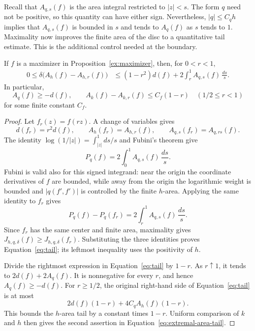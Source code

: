 Recall that $A_{q,s}(f)$ is the area integral restricted to $|z|<s$.
The form $q$ need not be positive, so this quantity can have either
sign. Nevertheless, $|q|\leq C_qh$ implies that $A_{q,s}(f)$ is bounded
in $s$ and tends to $A_q(f)$ as $s$ tends to $1$.
Maximality now improves the finite area of the disc to a quantitative
tail estimate. This is the additional control needed at the boundary.

\begin{lemma}
\label{ex:dilation}
If $f$ is a maximizer in Proposition~\ref{ex:maximizer}, then, for
$0<r<1$,
\begin{equation}
 \begin{split}
 0\leq\delta\bigl(A_h(f)-A_{h,r}(f)\bigr)
 &\leq(1-r^2)d(f)
       +2\int_r^1 A_{q,s}(f)\,\frac{ds}{s}.
 \end{split}
 \label{eq:tail}
\end{equation}
In particular,
\begin{equation}
 A_q(f)\geq-d(f),\qquad
 A_k(f)-A_{k,r}(f)\leq C_f(1-r)\quad(1/2\leq r<1)
 \label{eq:extremal-area-tail}
\end{equation}
for some finite constant $C_f$.
\end{lemma}

\begin{proof}
Let $f_r(z)=f(rz)$. A change of variables gives
\[
 d(f_r)=r^2d(f),\qquad
 A_h(f_r)=A_{h,r}(f),\qquad
 A_{q,s}(f_r)=A_{q,rs}(f).
\]
The identity $\log(1/|z|)=\int_{|z|}^1ds/s$ and Fubini's theorem give
\[
 P_q(f)=2\int_0^1 A_{q,s}(f)\,\frac{ds}{s}.
\]
Fubini is valid also for this signed integrand: near the origin the
coordinate derivatives of $f$ are bounded, while away from the
origin the logarithmic weight is bounded and $|q(f',f')|$ is controlled
by the finite $h$-area. Applying the same identity to $f_r$ gives
\begin{equation}
 P_q(f)-P_q(f_r)
   =2\int_r^1 A_{q,s}(f)\,\frac{ds}{s}.
 \label{eq:dilation-poisson}
\end{equation}
Since $f_r$ has the same center and finite area, maximality gives
$J_{h,q,\delta}(f)\geq J_{h,q,\delta}(f_r)$. Substituting the three
identities proves Equation~\eqref{eq:tail}; its leftmost inequality uses the
positivity of $h$.

Divide the rightmost expression in Equation~\eqref{eq:tail} by $1-r$. As
$r\uparrow1$, it tends to $2d(f)+2A_q(f)$. It is nonnegative for every
$r$, and hence $A_q(f)\geq-d(f)$. For $r\geq1/2$, the original
right-hand side of Equation~\eqref{eq:tail} is at most
\[
 2d(f)(1-r)+4C_qA_h(f)(1-r).
\]
This bounds the $h$-area tail by a constant times $1-r$. Uniform
comparison of $k$ and $h$ then gives the second assertion in
Equation~\eqref{eq:extremal-area-tail}.
\end{proof}

